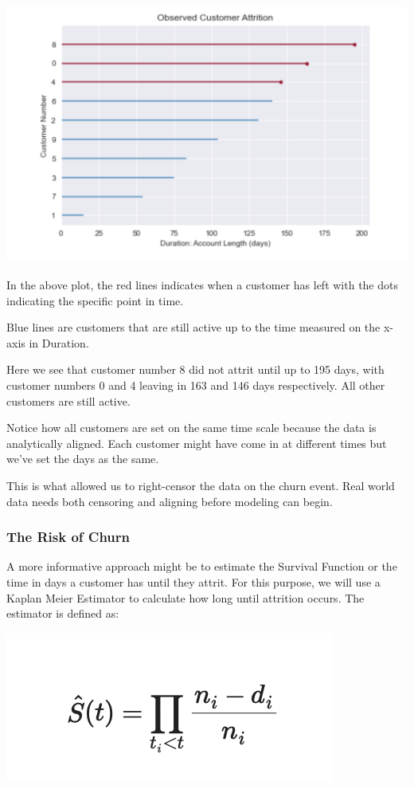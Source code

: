 \documentclass[
]{book}
\begin{document}
\includegraphics{figs/churn3.png}

In the above plot, the red lines indicates when a customer has left with the dots indicating the specific point in time.

Blue lines are customers that are still active up to the time measured on the x-axis in Duration.

Here we see that customer number 8 did not attrit until up to 195 days, with customer numbers 0 and 4 leaving in 163 and 146 days respectively. All other customers are still active.

Notice how all customers are set on the same time scale because the data is analytically aligned. Each customer might have come in at different times but we've set the days as the same.

This is what allowed us to right-censor the data on the churn event. Real world data needs both censoring and aligning before modeling can begin.

\hypertarget{the-risk-of-churn}{%
\subsubsection{The Risk of Churn}\label{the-risk-of-churn}}

A more informative approach might be to estimate the Survival Function or the time in days a customer has until they attrit. For this purpose, we will use a Kaplan Meier Estimator to calculate how long until attrition occurs. The estimator is defined as:

\includegraphics{figs/churn4.png}
\end{document}
